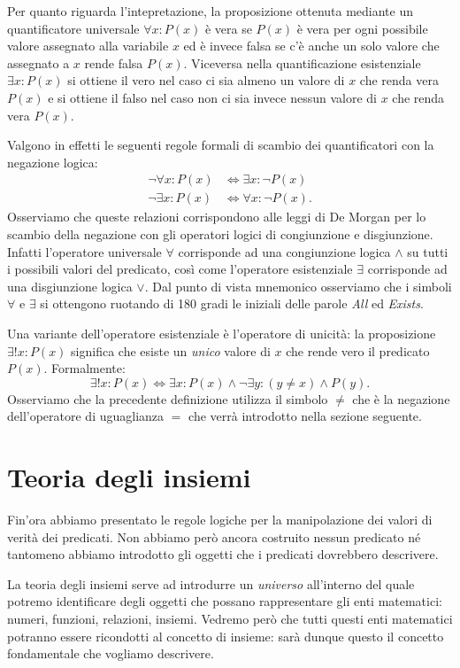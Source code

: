 \documentclass[italian,a4paper,hidelinks,headinclude]{scrartcl}
\begin{document}
Per quanto riguarda l'intepretazione,
la proposizione ottenuta mediante un quantificatore universale
$\forall x\colon P(x)$ è vera se $P(x)$ è vera per ogni possibile valore
assegnato alla variabile $x$ ed è invece falsa se c'è anche un solo valore che
assegnato a $x$ rende falsa $P(x)$. Viceversa nella quantificazione
esistenziale $\exists x\colon P(x)$ si ottiene il vero nel caso ci sia almeno
un valore di $x$ che renda vera $P(x)$ e si ottiene il falso nel caso non ci sia
invece nessun valore di $x$ che renda vera $P(x)$.

Valgono in effetti le seguenti regole formali di scambio dei quantificatori con
la negazione logica:
\begin{align*}
  \neg \forall x \colon P(x) &\iff \exists x \colon \neg P(x)\\
  \neg \exists x \colon P(x) &\iff \forall x \colon \neg P(x).
\end{align*}
Osserviamo che queste relazioni corrispondono alle leggi di De Morgan per lo
scambio della negazione con gli operatori logici di congiunzione e disgiunzione.
Infatti l'operatore universale $\forall$ corrisponde ad una congiunzione logica
$\wedge$ su tutti i possibili valori del predicato,
così come l'operatore esistenziale
$\exists$ corrisponde ad una disgiunzione logica $\vee$.
Dal punto di vista mnemonico osserviamo che i simboli $\forall$ e $\exists$
si ottengono ruotando di 180 gradi le iniziali delle parole
\emph{All} ed \emph{Exists}.

Una variante dell'operatore esistenziale è l'operatore di unicità:
la proposizione $\exists! x\colon P(x)$ significa che esiste un \emph{unico} valore di $x$
che rende vero il predicato $P(x)$. Formalmente:
\[
  \exists!x\colon P(x) \iff \exists x\colon P(x)
  \wedge \neg \exists y\colon (y \neq x) \wedge P(y).
\]
Osserviamo che la precedente definizione utilizza il simbolo $\neq$ che è la
negazione dell'operatore di uguaglianza $=$ che verrà introdotto nella sezione
seguente.

\section{Teoria degli insiemi}

Fin'ora abbiamo presentato le regole logiche per la manipolazione dei valori di
verità dei predicati. Non abbiamo però ancora costruito nessun predicato né
tantomeno abbiamo introdotto gli oggetti che i predicati dovrebbero descrivere.

La teoria degli insiemi serve ad introdurre un \emph{universo} all'interno del
quale potremo identificare degli oggetti che possano rappresentare gli enti
matematici: numeri, funzioni, relazioni, insiemi.
Vedremo però che tutti questi enti matematici potranno essere ricondotti al
concetto di insieme: sarà dunque questo il concetto fondamentale che vogliamo
descrivere.
\end{document}
